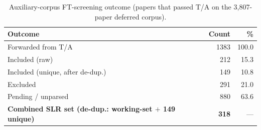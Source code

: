 \begin{table}[htbp]
\centering
\caption{Auxiliary-corpus FT-screening outcome (papers that passed T/A on the 3{,}807-paper deferred corpus).}
\label{tab:aux-ft-screening}
\begin{tabular}{lrr}
\toprule
\textbf{Outcome} & \textbf{Count} & \textbf{\%} \\
\midrule
Forwarded from T/A & 1383 & 100.0 \\
Included (raw)      & 212 & 15.3 \\
Included (unique, after de-dup.) & 149 & 10.8 \\
Excluded            & 291 & 21.0 \\
Pending / unparsed  & 880 & 63.6 \\
\midrule
\textbf{Combined SLR set (de-dup.: working-set $+$ 149 unique)} & \textbf{318} & --- \\
\bottomrule
\end{tabular}
\end{table}
